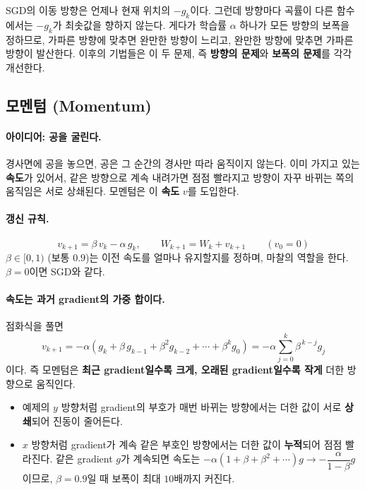 \documentclass[11pt,a4paper]{article}
\begin{document}
\begin{remarkbox}[SGD의 약점]
SGD의 이동 방향은 언제나 현재 위치의 $-g_k$이다.
그런데 방향마다 곡률이 다른 함수에서는 $-g_k$가 최솟값을 향하지 않는다.
게다가 학습률 $\alpha$ 하나가 모든 방향의 보폭을 정하므로,
가파른 방향에 맞추면 완만한 방향이 느리고, 완만한 방향에 맞추면 가파른 방향이 발산한다.
이후의 기법들은 이 두 문제, 즉 \textbf{방향의 문제}와 \textbf{보폭의 문제}를 각각 개선한다.
\end{remarkbox}

\subsection{모멘텀 (Momentum)}\label{sec:momentum}

\paragraph{아이디어: 공을 굴린다.}
경사면에 공을 놓으면, 공은 그 순간의 경사만 따라 움직이지 않는다.
이미 가지고 있는 \textbf{속도}가 있어서, 같은 방향으로 계속 내려가면 점점 빨라지고
방향이 자꾸 바뀌는 쪽의 움직임은 서로 상쇄된다.
모멘텀은 이 \textbf{속도} $v$를 도입한다.

\paragraph{갱신 규칙.}
\[
\boxed{
v_{k+1}=\beta\,v_k-\alpha\,g_k,
\qquad
W_{k+1}=W_k+v_{k+1}
}
\qquad(v_0=0)
\]
$\beta\in[0,1)$ (보통 $0.9$)는 이전 속도를 얼마나 유지할지를 정하며, 마찰의 역할을 한다.
$\beta=0$이면 SGD와 같다.

\paragraph{속도는 과거 gradient의 가중 합이다.}
점화식을 풀면
\[
v_{k+1}=-\alpha\left(g_k+\beta\,g_{k-1}+\beta^2g_{k-2}+\cdots+\beta^k g_0\right)
=-\alpha\sum_{j=0}^{k}\beta^{\,k-j}g_j
\]
이다. 즉 모멘텀은 \textbf{최근 gradient일수록 크게, 오래된 gradient일수록 작게} 더한 방향으로 움직인다.
\begin{itemize}[leftmargin=1.8em]
\item 예제의 $y$ 방향처럼 gradient의 부호가 매번 바뀌는 방향에서는 더한 값이 서로 \textbf{상쇄}되어 진동이 줄어든다.
\item $x$ 방향처럼 gradient가 계속 같은 부호인 방향에서는 더한 값이 \textbf{누적}되어 점점 빨라진다.
같은 gradient $g$가 계속되면 속도는 $-\alpha(1+\beta+\beta^2+\cdots)g\to-\dfrac{\alpha}{1-\beta}g$이므로,
$\beta=0.9$일 때 보폭이 최대 $10$배까지 커진다.
\end{itemize}
\end{document}
